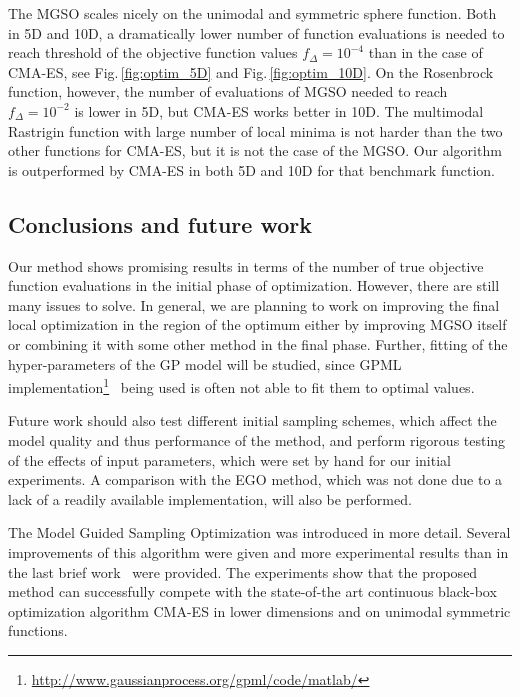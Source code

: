 \documentclass{itatnew}
\begin{document}
The MGSO scales nicely on the unimodal and symmetric sphere function. Both in 5D and 10D, a dramatically lower number of function evaluations is needed to reach threshold of the objective function values $f_{\Delta} = 10^{-4}$ than in the case of CMA-ES, see Fig.\,\ref{fig:optim_5D} and Fig.\,\ref{fig:optim_10D}. On the Rosenbrock function, however, the number of evaluations of MGSO needed to reach $f_{\Delta} = 10^{-2}$ is lower in 5D, but CMA-ES works better in 10D. The multimodal Rastrigin function with large number of local minima is not harder than the two other functions for CMA-ES, but it is not the case of the MGSO. Our algorithm is outperformed by CMA-ES in both 5D and 10D for that benchmark function.


\subsection{Conclusions and future work}

Our method shows promising results in terms of the number of true objective function evaluations in the initial phase of optimization. However, there are still many issues to solve. In general, we are planning to work on improving the final local optimization in the region of the optimum either by improving MGSO itself or combining it with some other method in the final phase. Further, fitting of the hyper-parameters of the GP model will be studied, since GPML implementation\footnote{\url{http://www.gaussianprocess.org/gpml/code/matlab/}}~\cite{rasmussen_gaussian_2010} being used is often not able to fit them to optimal values.

Future work should also test different initial sampling schemes, which affect the model quality and thus performance of the method, and perform rigorous testing of the effects of input parameters, which were set by hand for our initial experiments. A comparison with the EGO method, which was not done due to a lack of a readily available implementation, will also be performed. 

The Model Guided Sampling Optimization was introduced in more detail. Several improvements of this algorithm were given and more experimental results than in the last brief work~\cite{bajer_model_2013} were provided. The experiments show that the proposed method can successfully compete with the state-of-the art continuous black-box optimization algorithm CMA-ES in lower dimensions and on unimodal symmetric functions.
\end{document}
